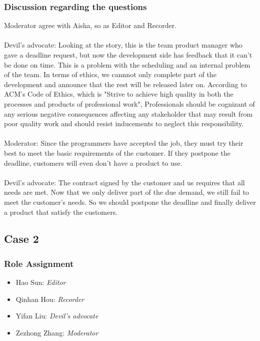 		\subsubsection{Discussion regarding the questions}
        Moderator agree with Aisha, so as Editor and Recorder.\\\\
        Devil’s advocate: Looking at the story, this is the team product manager who gave a deadline request, but now the development side has feedback that it can't be done on time. This is a problem with the scheduling and an internal problem of the team. In terms of ethics, we cannnot only complete part of the development and announce that the rest will be released later on. According to ACM’s Code of Ethics, which is "Strive to achieve high quality in both the processes and products of professional work", Professionals should be cognizant of any serious negative consequences affecting any stakeholder that may result from poor quality work and should resist inducements to neglect this responsibility.\\\\
        Moderator: Since the programmers have accepted the job, they must try their best to meet the basic requirements of the customer. If they postpone the deadline, customers will even don't have a product to use.\\\\
        Devil’s advocate: The contract signed by the customer and us requires that all needs are met. Now that we only deliver part of the due demand, we still fail to meet the customer's needs. So we should postpone the deadline and finally deliver a product that satisfy the customers.
        
	\subsection{Case 2}
		\subsubsection{Role Assignment}
		\begin{itemize}
  			\item Hao Sun: \emph{Editor}
  			\item Qinhan Hou: \emph{Recorder}
  			\item Yifan Liu: \emph{Devil’s advocate}
  			\item Zezhong Zhang: \emph{Moderator}
		\end{itemize}
